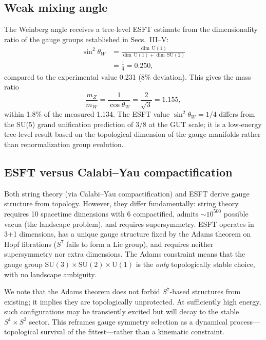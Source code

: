 \documentclass[a4paper,12pt]{article}
\begin{document}
\subsection{Weak mixing angle}

The Weinberg angle receives a tree-level ESFT estimate from the
dimensionality ratio of the gauge groups established in Secs.~III--V:
\begin{align}
\sin^2\theta_W &= \frac{\dim\,\mathrm{U}(1)}{\dim\,\mathrm{U}(1) + \dim\,\mathrm{SU}(2)} \nonumber\\
 &= \frac{1}{4} = 0.250,
\end{align}
compared to the experimental value 0.231 (8\% deviation).
This gives the mass ratio
\begin{equation}
\frac{m_Z}{m_W} = \frac{1}{\cos\theta_W} = \frac{2}{\sqrt{3}} = 1.155,
\end{equation}
within 1.8\% of the measured 1.134. The ESFT value $\sin^2\theta_W = 1/4$
differs from the SU(5) grand unification prediction of $3/8$ at the
GUT scale; it is a low-energy tree-level result based on the
topological dimension of the gauge manifolds rather than
renormalization group evolution.

\subsection{ESFT versus Calabi--Yau compactification}

Both string theory (via Calabi--Yau compactification) and ESFT derive
gauge structure from topology. However, they differ fundamentally:
string theory requires 10 spacetime dimensions with 6 compactified,
admits $\sim\!10^{500}$ possible vacua (the landscape problem), and
requires supersymmetry. ESFT operates in 3+1 dimensions, has a unique
gauge structure fixed by the Adams theorem on Hopf fibrations
($S^7$ fails to form a Lie group), and requires neither
supersymmetry nor extra dimensions. The Adams constraint means that
the gauge group $\mathrm{SU}(3) \times \mathrm{SU}(2) \times \mathrm{U}(1)$
is the \emph{only} topologically stable choice, with no landscape ambiguity.

We note that the Adams theorem does not forbid $S^7$-based structures
from existing; it implies they are topologically unprotected. At
sufficiently high energy, such configurations may be transiently
excited but will decay to the stable $S^1 \times S^3$ sector. This
reframes gauge symmetry selection as a dynamical process---topological
survival of the fittest---rather than a kinematic constraint.
\end{document}

